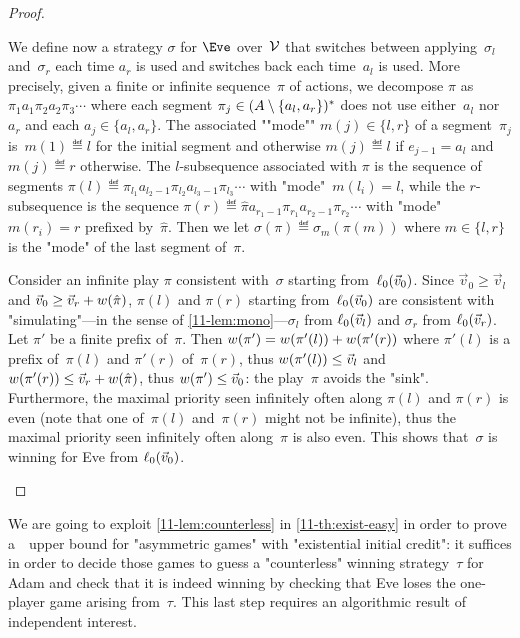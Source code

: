 \begin{proof}
  \begin{scope}
    We define now a strategy $\sigma$ for $\Eve$ over~$\mathcal V$ that
    switches between applying~$\sigma_l$ and~$\sigma_r$ each time
    $a_r$ is used and switches back each time~$a_l$ is used.  More
    precisely, given a finite or infinite sequence~$\pi$ of actions,
    we decompose $\pi$ as $\pi_1 a_1 \pi_2 a_2 \pi_3\cdots$ where each
    segment $\pi_j\in(A\setminus\{a_l,a_r\})^\ast$ does not use
    either~$a_l$ nor~$a_r$ and each $a_j\in\{a_l,a_r\}$.  The
    associated ""mode"" $m(j)\in\{l,r\}$ of a segment~$\pi_j$
    is~$m(1)\eqdef l$ for the initial segment and otherwise
    $m(j)\eqdef l$ if $e_{j-1}=a_l$ and $m(j)\eqdef r$ otherwise.  The
    $l$-subsequence associated with $\pi$ is the sequence of segments
    $\pi(l)\eqdef\pi_{l_1}a_{l_2-1}\pi_{l_2}a_{l_3-1}\pi_{l_3}\cdots$
    with "mode"~$m(l_i)=l$, while the $r$-subsequence is the sequence
    $\pi(r)\eqdef\hat\pi a_{r_1-1}\pi_{r_1}a_{r_2-1}\pi_{r_2}\cdots$
    with "mode"~$m(r_i)=r$ prefixed by~$\hat\pi$.  Then we let
    $\sigma(\pi)\eqdef\sigma_{m}(\pi(m))$ where $m\in\{l,r\}$ is the
    "mode" of the last segment of~$\pi$.

    Consider an infinite play $\pi$ consistent with~$\sigma$ starting
    from~$\ell_0(\vec v_0)$.  Since $\vec v_0\geq\vec v_l$ and
    $\vec v_0\geq \vec v_r+w(\hat\pi)$, $\pi(l)$ and $\pi(r)$
    starting from~$\ell_0(\vec v_0)$ are consistent with
    "simulating"---in the sense of \cref{11-lem:mono}---$\sigma_l$
    from $\ell_0(\vec v_l)$ and $\sigma_r$ from $\ell_0(\vec v_r)$.
    Let $\pi'$ be a finite prefix of~$\pi$.  Then
    $w(\pi')=w(\pi'(l))+w(\pi'(r))$ where $\pi'(l)$
    is a prefix of~$\pi(l)$ and $\pi'(r)$ of~$\pi(r)$, thus
    $w(\pi'(l))\leq\vec v_l$ and
    $w(\pi'(r))\leq\vec v_r+w(\hat\pi)$, thus
    $w(\pi')\leq\vec v_0$: the play~$\pi$ avoids the "sink".
    Furthermore, the maximal priority seen infinitely often along
    $\pi(l)$ and $\pi(r)$ is even (note that one of~$\pi(l)$
    and~$\pi(r)$ might not be infinite), thus the maximal priority
    seen infinitely often along~$\pi$ is also even.  This shows
    that~$\sigma$ is winning for Eve from $\ell_0(\vec v_0)$.
  \end{scope}
\end{proof}

We are going to exploit \cref{11-lem:counterless}
in \cref{11-th:exist-easy} in order to prove a~\coNP\ upper bound for
"asymmetric games" with "existential initial credit": it suffices in
order to decide those games to guess a "counterless" winning
strategy~$\tau$ for Adam and check that it is indeed winning by
checking that Eve loses the one-player game arising from~$\tau$.
This last step requires an algorithmic result of independent interest.

